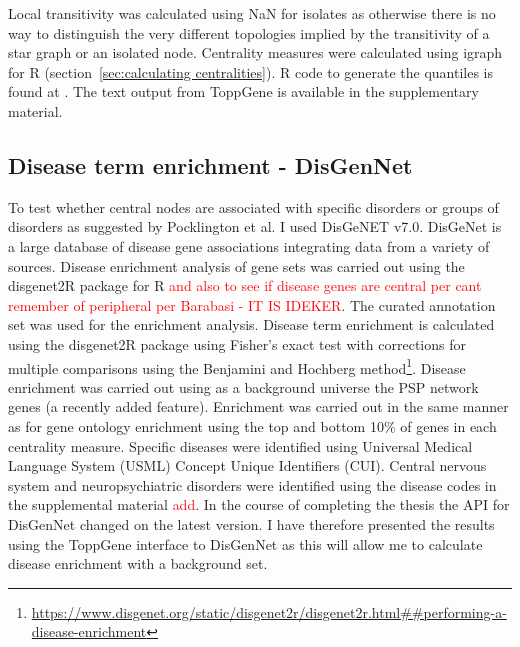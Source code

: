 Local transitivity was calculated using NaN for isolates as otherwise  there is no way to distinguish the very different topologies implied by the transitivity of a star graph or an isolated node. Centrality measures were calculated using igraph for R (section~\ref{sec:calculating centralities}). R code to generate the quantiles is found at . The text output from ToppGene is available in the supplementary material.





\subsection{Disease term enrichment - DisGenNet}

To test whether central nodes are associated with specific disorders or groups of disorders as suggested by Pocklington et al. \cite{pocklington2006organization} I used DisGeNET v7.0. DisGeNet is a large database of disease gene associations integrating data from a variety of sources\cite{pinero2016disgenet}. Disease enrichment analysis of gene sets was carried out using the disgenet2R package for R\cite{pinero2020disgenet} \textcolor{red}{and also to see if disease genes are central per cant remember of peripheral per Barabasi - IT IS IDEKER}. The curated annotation set was used for the enrichment analysis. Disease term enrichment is calculated using the disgenet2R package using Fisher's exact test with corrections for multiple comparisons using the Benjamini and Hochberg method\footnote{\url{https://www.disgenet.org/static/disgenet2r/disgenet2r.html##performing-a-disease-enrichment}}. Disease enrichment was carried out using as a background universe the PSP network genes (a recently added feature). Enrichment was carried out in the same manner as for gene ontology enrichment using the top and bottom 10\% of genes in each centrality measure. 
Specific diseases were identified using Universal Medical Language System (USML) Concept Unique Identifiers (CUI)\cite{campbell1998representing}. Central nervous system and neuropsychiatric disorders were identified using the disease codes in the supplemental material \textcolor{red}{add}. In the course of completing the thesis the API for DisGenNet changed on the latest version. I have therefore presented the results using the ToppGene interface to DisGenNet as this will allow me to calculate disease enrichment with a background set. 

